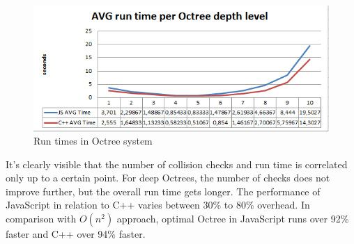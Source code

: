 \begin{figure}[h!]
  \caption{Run times in Octree system}
  \label{img:octree-time}
  \centering
	\includegraphics[width=16cm]{spheres/octree-time.png}
\end{figure}

It's clearly visible that the number of collision checks and run time is correlated only up to a certain point. For deep Octrees, the number of checks does not improve further, but the overall run time gets longer. The performance of JavaScript in relation to C++ varies between 30\% to 80\% overhead. In comparison with $O(n^2)$ approach, optimal Octree in JavaScript runs over 92\% faster and C++ over 94\% faster.

